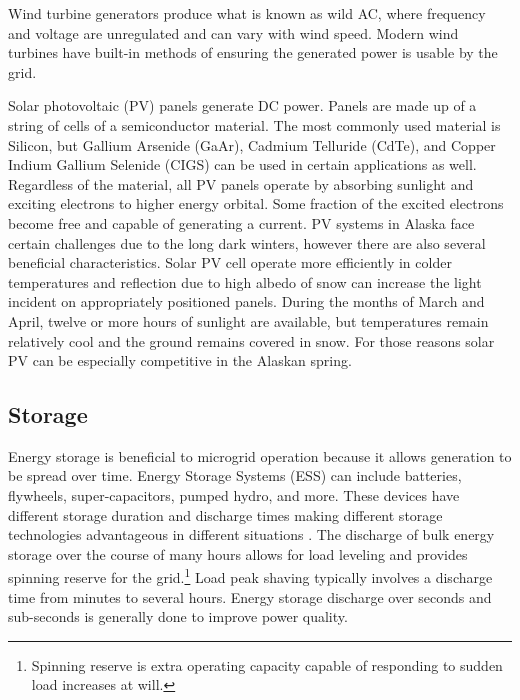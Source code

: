 Wind turbine generators produce what is known as wild AC, where frequency and voltage are unregulated and can vary with wind speed. Modern wind turbines have built-in methods of ensuring the generated power is usable by the grid.

Solar photovoltaic (PV) panels generate DC power. Panels are made up of a string of cells of a semiconductor material. The most commonly used material is Silicon, but Gallium Arsenide (GaAr), Cadmium Telluride (CdTe), and Copper Indium Gallium Selenide (CIGS) can be used in certain applications as well. Regardless of the material, all PV panels operate by absorbing sunlight and exciting electrons to higher energy orbital. Some fraction of the excited electrons become free and capable of generating a current. PV systems in Alaska face certain challenges due to the long dark winters, however there are also several beneficial characteristics. Solar PV cell operate more efficiently in colder temperatures and reflection due to high albedo of snow can increase the light incident on appropriately positioned panels. During the months of March and April, twelve or more hours of sunlight are available, but temperatures remain relatively cool and the ground remains covered in snow. For those reasons solar PV can be especially competitive in the Alaskan spring.

\subsection{Storage}
Energy storage is beneficial to microgrid operation because it allows generation to be spread over time. Energy Storage Systems (ESS) can include batteries, flywheels, super-capacitors, pumped hydro, and more. These devices have different storage duration and discharge times making different storage technologies advantageous in different situations \cite{Schoenung2003}. The discharge of bulk energy storage over the course of many hours allows for load leveling and provides spinning reserve for the grid.\footnote{Spinning reserve is extra operating capacity capable of responding to sudden load increases at will.} Load peak shaving typically involves a discharge time from minutes to several hours. Energy storage discharge over seconds and sub-seconds is generally done to improve power quality.

